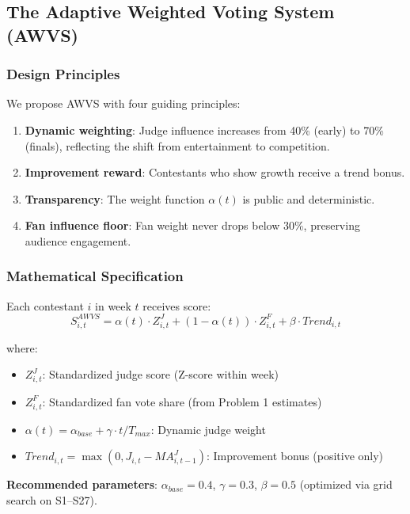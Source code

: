 \documentclass{mcmthesis}
\begin{document}
\subsection{The Adaptive Weighted Voting System (AWVS)}

\subsubsection{Design Principles}

We propose AWVS with four guiding principles:
\begin{enumerate}
    \item \textbf{Dynamic weighting}: Judge influence increases from 40\% (early) to 70\% (finals), reflecting the shift from entertainment to competition.
    \item \textbf{Improvement reward}: Contestants who show growth receive a trend bonus.
    \item \textbf{Transparency}: The weight function $\alpha(t)$ is public and deterministic.
    \item \textbf{Fan influence floor}: Fan weight never drops below 30\%, preserving audience engagement.
\end{enumerate}

\subsubsection{Mathematical Specification}

Each contestant $i$ in week $t$ receives score:
\begin{equation}
S^{AWVS}_{i,t} = \alpha(t) \cdot Z^{J}_{i,t} + (1-\alpha(t)) \cdot Z^{F}_{i,t} + \beta \cdot Trend_{i,t}
\end{equation}

where:
\begin{itemize}
    \item $Z^{J}_{i,t}$: Standardized judge score (Z-score within week)
    \item $Z^{F}_{i,t}$: Standardized fan vote share (from Problem 1 estimates)
    \item $\alpha(t) = \alpha_{base} + \gamma \cdot t/T_{max}$: Dynamic judge weight
    \item $Trend_{i,t} = \max(0, J_{i,t} - MA^{J}_{i,t-1})$: Improvement bonus (positive only)
\end{itemize}

\textbf{Recommended parameters}: $\alpha_{base}=0.4$, $\gamma=0.3$, $\beta=0.5$ (optimized via grid search on S1--S27).
\end{document}

